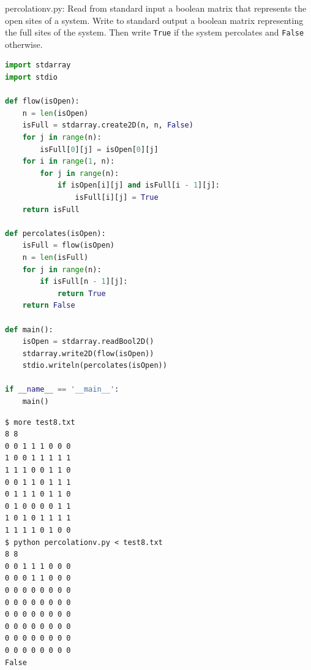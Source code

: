 \documentclass[8pt,a4paper,compress,handout]{beamer}
\begin{document}
\begin{frame}[fragile]
\begin{framed}
\tiny percolationv.py: Read from standard input a boolean matrix that represents the open sites of a system. Write to standard output a boolean matrix representing the full sites of the system. Then write \lstinline{True} if the system percolates and \lstinline{False} otherwise.
\end{framed}

\begin{lstlisting}[language=Python]
import stdarray
import stdio

def flow(isOpen):
    n = len(isOpen)
    isFull = stdarray.create2D(n, n, False)
    for j in range(n):
        isFull[0][j] = isOpen[0][j]
    for i in range(1, n):
        for j in range(n):
            if isOpen[i][j] and isFull[i - 1][j]:
                isFull[i][j] = True
    return isFull

def percolates(isOpen):
    isFull = flow(isOpen)
    n = len(isFull)
    for j in range(n):
        if isFull[n - 1][j]:
            return True
    return False

def main():
    isOpen = stdarray.readBool2D()
    stdarray.write2D(flow(isOpen))
    stdio.writeln(percolates(isOpen))
    
if __name__ == '__main__':
    main()
\end{lstlisting}
\end{frame}

\begin{frame}[fragile]
\begin{lstlisting}[language={}]
$ more test8.txt 
8 8
0 0 1 1 1 0 0 0
1 0 0 1 1 1 1 1
1 1 1 0 0 1 1 0
0 0 1 1 0 1 1 1
0 1 1 1 0 1 1 0
0 1 0 0 0 0 1 1
1 0 1 0 1 1 1 1
1 1 1 1 0 1 0 0
$ python percolationv.py < test8.txt 
8 8
0 0 1 1 1 0 0 0 
0 0 0 1 1 0 0 0 
0 0 0 0 0 0 0 0 
0 0 0 0 0 0 0 0 
0 0 0 0 0 0 0 0 
0 0 0 0 0 0 0 0 
0 0 0 0 0 0 0 0 
0 0 0 0 0 0 0 0 
False
\end{lstlisting}
\end{frame}
\end{document}
